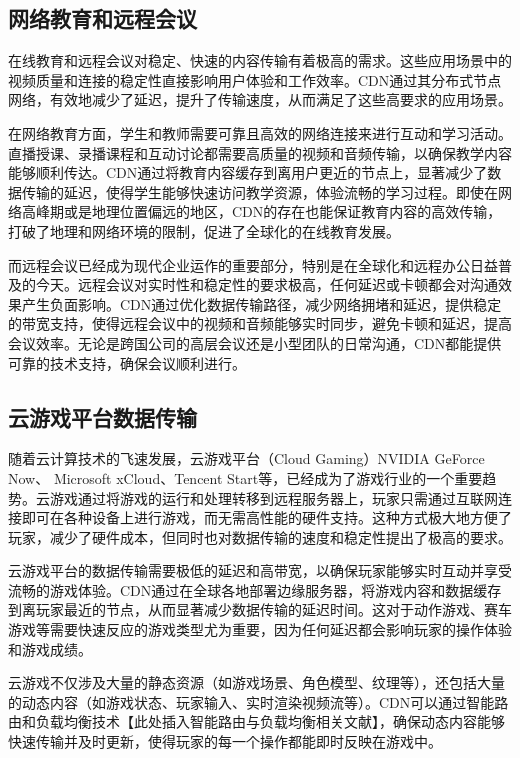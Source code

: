 \subsection{网络教育和远程会议}

在线教育和远程会议对稳定、快速的内容传输有着极高的需求。这些应用场景中的视频质量和连接的稳定性直接影响用户体验和工作效率。CDN通过其分布式节点网络，有效地减少了延迟，提升了传输速度，从而满足了这些高要求的应用场景。

在网络教育方面，学生和教师需要可靠且高效的网络连接来进行互动和学习活动\cite{hebert2022usability,ccankaya2020integrated,martin2020systematic,muller2021facilitating}。直播授课、录播课程和互动讨论都需要高质量的视频和音频传输，以确保教学内容能够顺利传达。CDN通过将教育内容缓存到离用户更近的节点上，显著减少了数据传输的延迟，使得学生能够快速访问教学资源，体验流畅的学习过程。即使在网络高峰期或是地理位置偏远的地区\cite{stenman2020remote}，CDN的存在也能保证教育内容的高效传输，打破了地理和网络环境的限制，促进了全球化的在线教育发展。

而远程会议已经成为现代企业运作的重要部分\cite{JIN2022109957}，特别是在全球化和远程办公日益普及的今天。远程会议对实时性和稳定性的要求极高，任何延迟或卡顿都会对沟通效果产生负面影响。CDN通过优化数据传输路径，减少网络拥堵和延迟，提供稳定的带宽支持，使得远程会议中的视频和音频能够实时同步，避免卡顿和延迟，提高会议效率。无论是跨国公司的高层会议还是小型团队的日常沟通，CDN都能提供可靠的技术支持，确保会议顺利进行。


\subsection{云游戏平台数据传输}

随着云计算技术的飞速发展，云游戏平台（Cloud Gaming）NVIDIA GeForce Now\cite{GeForceN49:online}、 Microsoft xCloud\cite{XboxClou70:online}、Tencent Start\cite{START85:online}等，已经成为了游戏行业的一个重要趋势。云游戏通过将游戏的运行和处理转移到远程服务器上，玩家只需通过互联网连接即可在各种设备上进行游戏，而无需高性能的硬件支持。这种方式极大地方便了玩家，减少了硬件成本，但同时也对数据传输的速度和稳定性提出了极高的要求。

云游戏平台的数据传输需要极低的延迟和高带宽，以确保玩家能够实时互动并享受流畅的游戏体验。CDN通过在全球各地部署边缘服务器\cite{zhang2021efficient}，将游戏内容和数据缓存到离玩家最近的节点，从而显著减少数据传输的延迟时间。这对于动作游戏、赛车游戏等需要快速反应的游戏类型尤为重要，因为任何延迟都会影响玩家的操作体验和游戏成绩\cite{meng2023enabling}。

云游戏不仅涉及大量的静态资源（如游戏场景、角色模型、纹理等），还包括大量的动态内容（如游戏状态、玩家输入、实时渲染视频流等）。CDN可以通过智能路由和负载均衡技术【此处插入智能路由与负载均衡相关文献】，确保动态内容能够快速传输并及时更新，使得玩家的每一个操作都能即时反映在游戏中。

